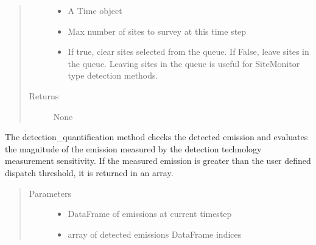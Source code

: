 \documentclass[letterpaper,10pt,english]{sphinxmanual}
\begin{document}
\begin{fulllineitems}
\begin{fulllineitems}
\begin{quote}
\begin{description}
\begin{itemize}
\item {} 
 \textendash{} A Time object

\item {} 
 \textendash{} Max number of sites to survey at this time step

\item {} 
 \textendash{} If true, clear sites selected from the queue. If False, leave sites in the queue.
Leaving sites in the queue is useful for SiteMonitor type detection methods.

\end{itemize}

\item[{Returns}] \leavevmode
None

\end{description}\end{quote}

\end{fulllineitems}


\begin{fulllineitems}
\label{\detokenize{index:feast.DetectionModules.abstract_detection_method.DetectionMethod.detection_quantification}}
The detection\_quantification method checks the detected emission and evaluates the magnitude of the emission
measured by the detection technology measurement sensitivity. If the measured emission is greater than the
user defined dispatch threshold, it is returned in an array.
\begin{quote}\begin{description}
\item[{Parameters}] \leavevmode\begin{itemize}
\item {} 
 \textendash{} DataFrame of emissions at current time\sphinxhyphen{}step

\item {} 
 \textendash{} array of detected emissions DataFrame indices


\end{itemize}
\end{description}
\end{quote}
\end{fulllineitems}
\end{fulllineitems}
\end{document}
